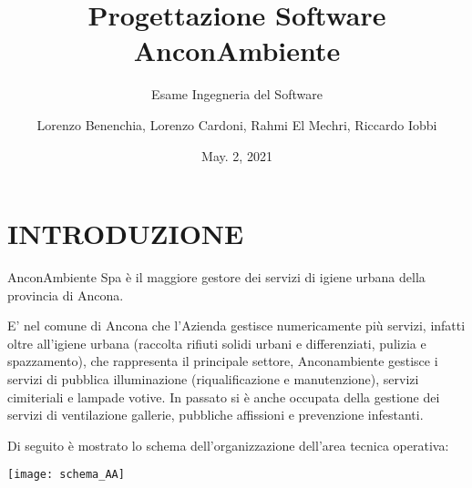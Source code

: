 \documentclass[green, fancy, 11pt]{elegantbook}
\title{Progettazione Software AnconAmbiente}
\subtitle{Esame Ingegneria del Software}
\author{Lorenzo Benenchia, Lorenzo Cardoni, Rahmi El Mechri, Riccardo Iobbi}
\institute{UNIVPM}
\date{May. 2, 2021}
\begin{document}
\maketitle

\frontmatter
\tableofcontents

\mainmatter

\chapter{INTRODUZIONE}
\noindent AnconAmbiente Spa è il maggiore gestore dei servizi di igiene urbana della provincia di Ancona.

\noindent E’ nel comune di Ancona che l’Azienda gestisce numericamente più servizi, infatti oltre all’igiene urbana (raccolta rifiuti solidi urbani e differenziati, pulizia e spazzamento), che rappresenta il principale settore, Anconambiente gestisce i servizi di pubblica illuminazione (riqualificazione e manutenzione), servizi cimiteriali e lampade votive. In passato si è anche occupata della gestione dei servizi di ventilazione gallerie, 
pubbliche affissioni e prevenzione infestanti.

\noindent Di seguito è mostrato lo schema dell'organizzazione dell'area tecnica operativa:\\

\begin{center}
	\texttt{[image: schema\_AA]}\\
\end{center}
\newpage
\end{document}
